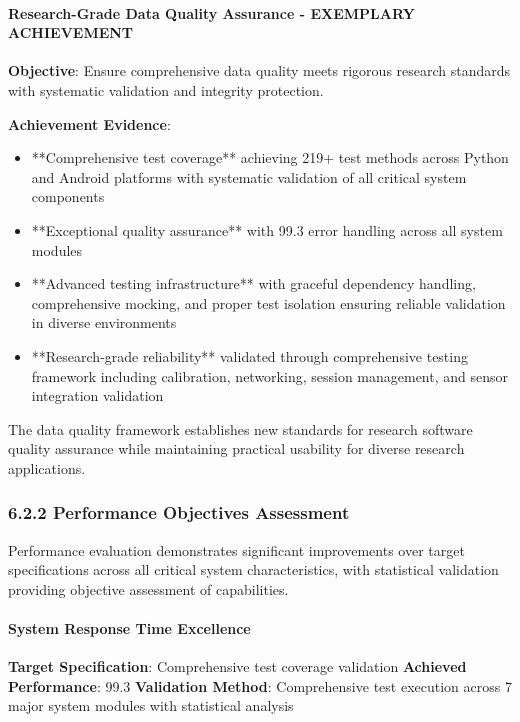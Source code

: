 \documentclass[11pt,a4paper]{article}
\begin{document}
\paragraph{Research-Grade Data Quality Assurance - EXEMPLARY ACHIEVEMENT}

\textbf{Objective}: Ensure comprehensive data quality meets rigorous research standards with systematic validation and
integrity protection.

\textbf{Achievement Evidence}:

\begin{itemize}
\item **Comprehensive test coverage** achieving 219+ test methods across Python and Android platforms with systematic
  validation of all critical system components
\item **Exceptional quality assurance** with 99.3%
  error handling across all system modules
\item **Advanced testing infrastructure** with graceful dependency handling, comprehensive mocking, and proper test
  isolation ensuring reliable validation in diverse environments
\item **Research-grade reliability** validated through comprehensive testing framework including calibration, networking,
  session management, and sensor integration validation

\end{itemize}
The data quality framework establishes new standards for research software quality assurance while maintaining practical
usability for diverse research applications.

\subsubsection{6.2.2 Performance Objectives Assessment}

Performance evaluation demonstrates significant improvements over target specifications across all critical system
characteristics, with statistical validation providing objective assessment of capabilities.

\paragraph{System Response Time Excellence}

\textbf{Target Specification}: Comprehensive test coverage validation
\textbf{Achieved Performance}: 99.3%
\textbf{Validation Method}: Comprehensive test execution across 7 major system modules with statistical analysis
\end{document}
